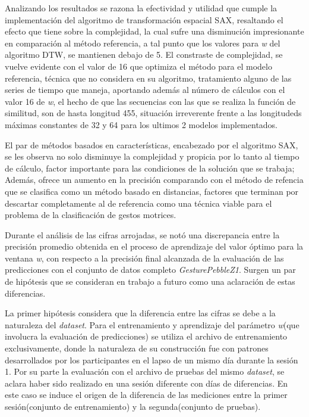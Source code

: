 \hfill\break
\justifying
Analizando los resultados se razona la efectividad y utilidad que cumple la implementación del algoritmo de transformación espacial SAX, resaltando el efecto que tiene sobre la complejidad, la cual sufre una disminución impresionante en comparación al método referencia, a tal punto que los valores para \textit{w} del algoritmo DTW, se mantienen debajo de 5. El constraste de complejidad, se vuelve evidente con el valor de 16 que optimiza el método para el modelo referencia, técnica que no considera en su algoritmo, tratamiento alguno de las series de tiempo que maneja, aportando además al número de cálculos con el valor 16 de \textit{w}, el hecho de que las secuencias con las que se realiza la función de similitud, son de hasta longitud 455, situación irreverente frente a las longitudeds máximas constantes de 32 y 64 para los ultimos 2 modelos implementados.

\hfill\break
\justifying
El par de métodos basados en características, encabezado por el algoritmo SAX, se les observa no solo disminuye la complejidad y propicia por lo tanto al tiempo de cálculo, factor importante para las condiciones de la solución que se trabaja; Además, ofrece un aumento en la precisión comparando con el método de refencia que se clasifica como un método basado en distancias, factores que terminan por descartar completamente al de referencia como una técnica viable para el problema de la clasificación de gestos motrices.

\hfill\break
\justifying
Durante el análisis de las cifras arrojadas, se notó una discrepancia entre la precisión promedio obtenida en el proceso de aprendizaje del valor óptimo para la ventana \textit{w}, con respecto a la precisión final alcanzada de la evaluación de las predicciones con el conjunto de datos completo \textit{GesturePebbleZ1}. Surgen un par de hipótesis que se consideran en trabajo a futuro como una aclaración de estas diferencias.

\hfill\break
\justifying
La primer hipótesis considera que la diferencia entre las cifras se debe a la naturaleza del \textit{dataset}. Para el entrenamiento y aprendizaje del parámetro \textit{w}(que involucra la evaluación de predicciones) se utiliza el archivo de entrenamiento exclusivamente, donde la naturaleza de su construcción fue con patrones desarrollados por los participantes en el lapso de un mismo día durante la sesión 1. Por su parte la evaluación con el archivo de pruebas del mismo \textit{dataset}, se aclara haber sido realizado en una sesión diferente con días de diferencias. En este caso se induce el origen de la diferencia de las mediciones entre la primer sesión(conjunto de entrenamiento) y la segunda(conjunto de pruebas).

